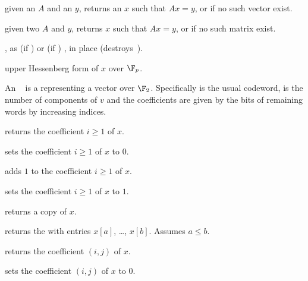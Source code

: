 
 given an 
$A$ and an  $y$, returns an $x$ such that $Ax = y$, or 
if no such vector exist.

given two  $A$ and $y$, returns $x$ such that $Ax = y$, or 
if no such matrix exist.


, as  (if
) or  (if ) , in place
(destroys~).






 upper Hessenberg form of $x$ over $\F_p$.

  An ~ is a
 representing a vector over $\F_2$. Specifically  is
the usual codeword,  is the number of components of $v$ and the
coefficients are given by the bits of remaining words by increasing indices.

 returns the coefficient $i\ge 1$ of $x$.

 sets the coefficient $i\ge 1$ of $x$ to
$0$.

 adds $1$ to the coefficient $i\ge 1$ of $x$.

 sets the coefficient $i\ge 1$ of $x$ to $1$.

 returns a copy of $x$.

 returns the  with
entries $x[a]$, \dots, $x[b]$. Assumes $a \leq b$.

 returns the coefficient $(i,j)$
of $x$.

 sets the coefficient $(i,j)$ of $x$
to $0$.

